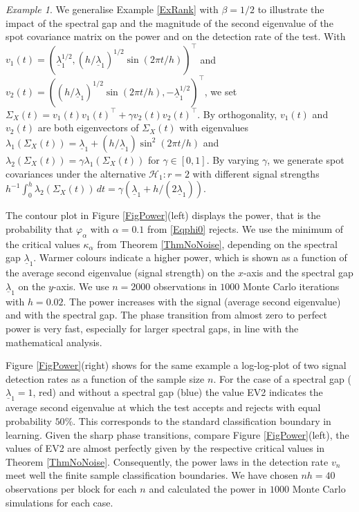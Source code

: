 \documentclass[preprint,aos]{imsart}
\numberwithin{equation}{section}
\theoremstyle{remark}
\newtheorem{example}[satz]{Example}
\renewcommand{\phi}{\varphi}
\begin{document}
\begin{example}\label{ExRank2}
We generalise Example \ref{ExRank} with $\beta=1/2$ to illustrate  the impact of the spectral gap and the magnitude of the second eigenvalue of the spot covariance matrix on the power and on the detection rate of the test. With $v_1(t)=(\underline\lambda_1^{1/2},(h/\underline\lambda_1)^{1/2}\sin(2\pi t/h))^\top$ and $v_2(t)=((h/\underline\lambda_1)^{1/2}\sin(2\pi t/h), -\underline\lambda_1^{1/2})^\top$, we set
$\Sigma_X(t)=v_1(t)v_1(t)^\top+\gamma v_2(t)v_2(t)^\top$.
By orthogonality, $v_1(t)$ and $v_2(t)$ are both  eigenvectors of $\Sigma_X(t)$ with eigenvalues $\lambda_1(\Sigma_X(t))=\underline\lambda_1+(h/\underline\lambda_1)\sin^2(2\pi t/h)$ and $\lambda_2(\Sigma_X(t))=\gamma\lambda_1(\Sigma_X(t))$ for $\gamma\in[0,1]$. By varying $\gamma$, we generate spot covariances under the alternative ${\mathcal H}_1: r=2$ with different signal strengths $h^{-1}\int_0^h\lambda_2(\Sigma_X(t))\,dt=\gamma(\underline\lambda_1+h/(2\underline\lambda_1))$.

The contour plot in Figure \ref{FigPower}(left) displays the power, that is the probability that $\phi_\alpha$ with $\alpha=0.1$ from \eqref{Eqphi0} rejects. We use the minimum of the critical values $\kappa_\alpha$ from Theorem \ref{ThmNoNoise}, depending on the spectral gap $\underline\lambda_1$. Warmer colours indicate a higher power, which is shown as a function of the average second eigenvalue (signal strength) on the $x$-axis and the spectral gap $\underline\lambda_1$ on the $y$-axis. We use $n=2000$ observations in $1000$ Monte Carlo iterations with $h=0.02$. The power increases with the signal (average second eigenvalue) and with the spectral gap. The phase transition from almost zero to perfect power is very fast, especially for larger spectral gaps, in line with the mathematical analysis.

Figure \ref{FigPower}(right) shows for the same example a log-log-plot of two signal detection rates as a function of the sample size $n$. For the case of a spectral gap ($\underline\lambda_1=1$, red) and without a spectral gap (blue) the value EV2 indicates the  average second eigenvalue at which the test accepts and rejects with equal probability $50\%$. This corresponds to the standard classification boundary in learning. Given the sharp phase transitions, compare Figure \ref{FigPower}(left), the values of EV2 are almost perfectly given by the respective critical values in Theorem \ref{ThmNoNoise}. Consequently, the power laws in the detection rate $v_n$ meet well the finite sample classification boundaries. We have chosen $nh=40$ observations per block for each $n$ and calculated the power in $1000$ Monte Carlo simulations for each case.
\end{example}
\end{document}
